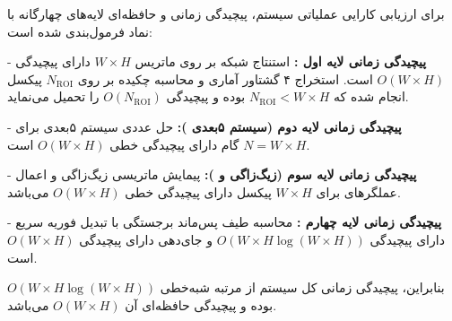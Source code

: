 


برای ارزیابی کارایی عملیاتی سیستم، پیچیدگی زمانی و حافظه‌ای لایه‌های چهارگانه با نماد  فرمول‌بندی شده است:\par



{-} \textbf{پیچیدگی زمانی لایه اول :} استنتاج شبکه  بر روی ماتریس $W \times H$ دارای پیچیدگی $O(W \times H)$ است. استخراج ۴ گشتاور آماری و محاسبه چکیده  بر روی $N_{\mathrm{ROI}}$ پیکسل انجام شده که $N_{\mathrm{ROI}} < W \times H$ بوده و پیچیدگی $O(N_{\mathrm{ROI}})$ را تحمیل می‌نماید.\par

{-} \textbf{پیچیدگی زمانی لایه دوم (سیستم ۵بعدی ):} حل عددی سیستم ۵بعدی برای $N = W \times H$ گام دارای پیچیدگی خطی $O(W \times H)$ است.\par

{-} \textbf{پیچیدگی زمانی لایه سوم (زیگ‌زاگی و ):} پیمایش ماتریسی زیگ‌زاگی و اعمال عملگرهای  برای $W \times H$ پیکسل دارای پیچیدگی خطی $O(W \times H)$ می‌باشد.\par

{-} \textbf{پیچیدگی زمانی لایه چهارم :} محاسبه طیف پس‌ماند برجستگی با تبدیل فوریه سریع  دارای پیچیدگی $O(W \times H \log(W \times H))$ و جای‌دهی  دارای پیچیدگی $O(W \times H)$ است.\par



بنابراین، پیچیدگی زمانی کل سیستم از مرتبه شبه‌خطی $O(W \times H \log(W \times H))$ بوده و پیچیدگی حافظه‌ای آن $O(W \times H)$ می‌باشد.\par




